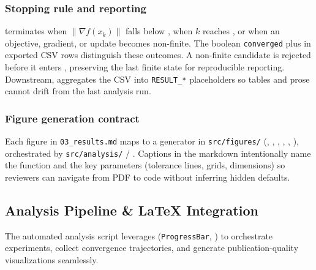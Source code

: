 \documentclass[
  english,
]{article}
\begin{document}
\subsubsection{Stopping rule and
reporting}\label{stopping-rule-and-reporting}

 terminates when \(\|\nabla f(x_k)\|\) falls
below , when \(k\) reaches
, or when an objective, gradient, or
update becomes non-finite. The boolean \texttt{converged} plus
 in exported CSV rows distinguish these
outcomes. A non-finite candidate is rejected before it enters
, preserving the last finite state for
reproducible reporting. Downstream,
 aggregates the
CSV into \texttt{RESULT\_*} placeholders so tables and prose cannot
drift from the last analysis run.

\subsubsection{Figure generation
contract}\label{figure-generation-contract}

Each figure in \texttt{03\_results.md} maps to a generator in
\texttt{src/figures/} (,
,
,
,
,
), orchestrated by
\texttt{src/analysis/} / .
Captions in the markdown intentionally name the function and the key
parameters (tolerance lines, grids, dimensions) so reviewers can
navigate from PDF to code without inferring hidden defaults.

\subsection{Analysis Pipeline \& LaTeX
Integration}\label{analysis-pipeline-latex-integration}

The automated analysis script leverages
\href{https://github.com/docxology/template/blob/main/infrastructure/core/progress.py}{}
(\texttt{ProgressBar}, ) to orchestrate
experiments, collect convergence trajectories, and generate
publication-quality visualizations seamlessly.
\end{document}
